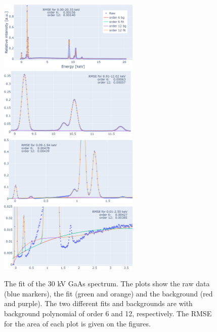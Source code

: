
\begin{figure}[p]
    \centering
    \includegraphics[width=0.6\textwidth]{figures/fit/fit_GaAs30kV_whole.png}
    \includegraphics[width=0.6\textwidth]{figures/fit/fit_GaAs30kV_K.png}
    \includegraphics[width=0.6\textwidth]{figures/fit/fit_GaAs30kV_L.png}
    \includegraphics[width=0.6\textwidth]{figures/fit/fit_GaAs30kV_bg.png}
    \caption{
        The fit of the 30 kV GaAs spectrum.
        The plots show the raw data (blue markers), the fit (green and orange) and the background (red and purple).
        The two different fits and backgrounds are with background polynomial of order 6 and 12, respectively.
        The RMSE for the area of each plot is given on the figures.
    }
    \label{fig:results:fit_GaAs30kV}
\end{figure}

